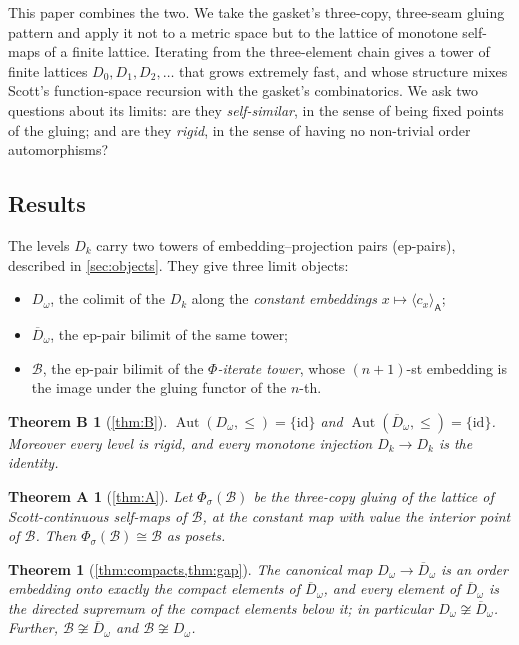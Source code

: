 \documentclass[11pt]{amsart}
\theoremstyle{plain}
\newtheorem*{theoremA}{Theorem A}
\newtheorem*{theoremB}{Theorem B}
\newtheorem*{theoremS}{Theorem}
\theoremstyle{definition}
\newcommand{\Aut}{\operatorname{Aut}}
\newcommand{\cst}[1]{c_{#1}}
\newcommand{\tg}[2]{\langle #1\rangle_{\mathsf{#2}}}
\newcommand{\Dc}{D_\omega}
\newcommand{\Db}{\overline{D}_\omega}
\newcommand{\BB}{\mathcal{B}}
\newcommand{\id}{\mathrm{id}}
\newcommand{\iso}{\cong}
\begin{document}
This paper combines the two. We take the gasket's three-copy, three-seam gluing
pattern and apply it not to a metric space but to the lattice of monotone
self-maps of a finite lattice. Iterating from the three-element chain gives a
tower of finite lattices $D_0, D_1, D_2,\dots$ that grows extremely fast, and
whose structure mixes Scott's function-space recursion with the gasket's
combinatorics. We ask two questions about its limits: are they
\emph{self-similar}, in the sense of being fixed points of the gluing; and are
they \emph{rigid}, in the sense of having no non-trivial order automorphisms?

\subsection*{Results}
The levels $D_k$ carry two towers of embedding--projection pairs (ep-pairs),
described in \cref{sec:objects}. They give three limit objects:
\begin{itemize}[leftmargin=2em]
\item $\Dc$, the colimit of the $D_k$ along the \emph{constant embeddings}
  $x\mapsto\tg{\cst x}{A}$;
\item $\Db$, the ep-pair bilimit of the same tower;
\item $\BB$, the ep-pair bilimit of the \emph{$\Phi$-iterate tower}, whose
  $(n{+}1)$-st embedding is the image under the gluing functor of the $n$-th.
\end{itemize}

\begin{theoremB}[\cref{thm:B}]
$\Aut(\Dc,\le)=\{\id\}$ and $\Aut(\Db,\le)=\{\id\}$. Moreover every level is
rigid, and every monotone injection $D_k\to D_k$ is the identity.
\end{theoremB}

\begin{theoremA}[\cref{thm:A}]
Let $\Phi_\sigma(\BB)$ be the three-copy gluing of the lattice of
Scott-continuous self-maps of $\BB$, at the constant map with value the
interior point of $\BB$. Then $\Phi_\sigma(\BB)\iso\BB$ as posets.
\end{theoremA}

\begin{theoremS}[\cref{thm:compacts,thm:gap}]
The canonical map $\Dc\to\Db$ is an order embedding onto exactly the compact
elements of $\Db$, and every element of $\Db$ is the directed supremum of the
compact elements below it; in particular $\Dc\not\iso\Db$. Further,
$\BB\not\iso\Db$ and $\BB\not\iso\Dc$.
\end{theoremS}
\end{document}
